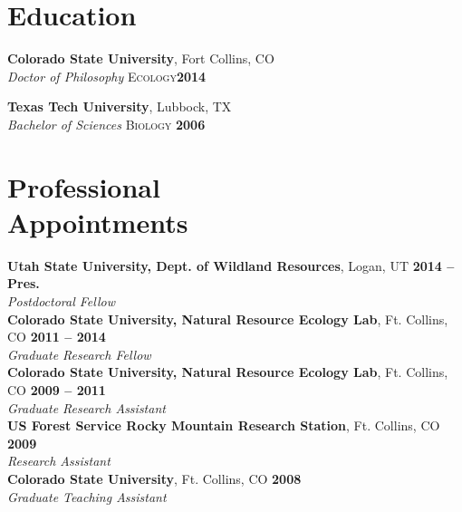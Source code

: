 \documentclass[margin,line]{resume}
\begin{document}
\begin{resume}
    \section{\mysidestyle Education}

    \textbf{Colorado State University}, Fort Collins, CO \vspace{1mm}\\\vspace{1mm}%
    \textsl{Doctor of Philosophy} \textsc{Ecology}\hfill \textbf{2014}\vspace{-3mm}\\\vspace{-1mm}%
    
    \textbf{Texas Tech University}, Lubbock, TX \vspace{1mm}\\\vspace{1mm}%
    \textsl{Bachelor of Sciences} \textsc{Biology} \hfill \textbf{2006}\vspace{-3mm}\\\vspace{-1mm}%
    
    \section{\mysidestyle Professional\\Appointments}
    \textbf{Utah State University, Dept. of Wildland Resources}, Logan, UT \hfill \textbf{2014 -- Pres.} \\
		\textsl{Postdoctoral Fellow} \vspace{.5mm}\\
    \textbf{Colorado State University, Natural Resource Ecology Lab}, Ft. Collins, CO \hfill \textbf{2011 -- 2014}\\
		\textsl{Graduate Research Fellow}\vspace{.5mm}\\ 
    \textbf{Colorado State University, Natural Resource Ecology Lab}, Ft. Collins, CO \hfill \textbf{2009 -- 2011}\\
		\textsl{Graduate Research Assistant}\vspace{.5mm}\\ 
     \textbf{US Forest Service Rocky Mountain Research Station}, Ft. Collins, CO \hfill \textbf{2009}\\
		\textsl{Research Assistant}\vspace{.5mm}\\ 		
     \textbf{Colorado State University}, Ft. Collins, CO \hfill \textbf{2008}\\
		\textsl{Graduate Teaching Assistant}\\ 


\end{resume}
\end{document}
